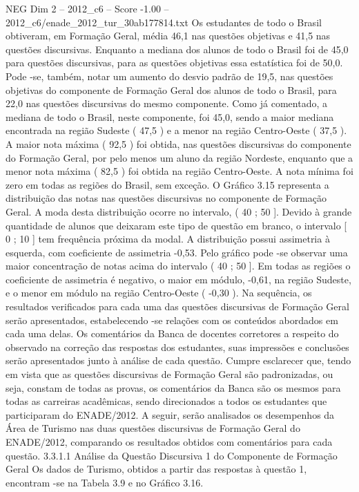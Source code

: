 \begin{textsample}{NEG Dim 2 – 2012\_c6 – Score -1.00 – 2012\_c6/enade\_2012\_tur\_30ab177814.txt}
Os estudantes de todo o Brasil obtiveram, em Formação Geral, média 46,1 nas questões objetivas e 41,5 nas questões discursivas.
Enquanto a mediana dos alunos de todo o Brasil foi de 45,0 para questões discursivas, para as questões objetivas essa estatística foi de 50,0.
Pode -se, também, notar um aumento do desvio padrão de 19,5, nas questões objetivas do componente de Formação Geral dos alunos de todo o Brasil, para 22,0 nas questões discursivas do mesmo componente.
Como já comentado, a mediana de todo o Brasil, neste componente, foi 45,0, sendo a maior mediana encontrada na região Sudeste ( 47,5 ) e a menor na região Centro-Oeste ( 37,5 ).
A maior nota máxima ( 92,5 ) foi obtida, nas questões discursivas do componente do Formação Geral, por pelo menos um aluno da região Nordeste, enquanto que a menor nota máxima ( 82,5 ) foi obtida na região Centro-Oeste.
A nota mínima foi zero em todas as regiões do Brasil, sem exceção.
O Gráfico 3.15 representa a distribuição das notas nas questões discursivas no componente de Formação Geral.
A moda desta distribuição ocorre no intervalo, ( 40 ; 50 ].
Devido à grande quantidade de alunos que deixaram este tipo de questão em branco, o intervalo [ 0 ; 10 ] tem frequência próxima da modal.
A distribuição possui assimetria à esquerda, com coeficiente de assimetria -0,53.
Pelo gráfico pode -se observar uma maior concentração de notas acima do intervalo ( 40 ; 50 ].
Em todas as regiões o coeficiente de assimetria é negativo, o maior em módulo, -0,61, na região Sudeste, e o menor em módulo na região Centro-Oeste ( -0,30 ).
Na sequência, os resultados verificados para cada uma das questões discursivas de Formação Geral serão apresentados, estabelecendo -se relações com os conteúdos abordados em cada uma delas.
Os comentários da Banca de docentes corretores a respeito do observado na correção das respostas dos estudantes, suas impressões e conclusões serão apresentados junto à análise de cada questão.
Cumpre esclarecer que, tendo em vista que as questões discursivas de Formação Geral são padronizadas, ou seja, constam de todas as provas, os comentários da Banca são os mesmos para todas as carreiras acadêmicas, sendo direcionados a todos os estudantes que participaram do ENADE/2012.
A seguir, serão analisados os desempenhos da Área de Turismo nas duas questões discursivas de Formação Geral do ENADE/2012, comparando os resultados obtidos com comentários para cada questão. 3.3.1.1 Análise da Questão Discursiva 1 do Componente de Formação Geral Os dados de Turismo, obtidos a partir das respostas à questão 1, encontram -se na Tabela 3.9 e no Gráfico 3.16.

\end{textsample}
